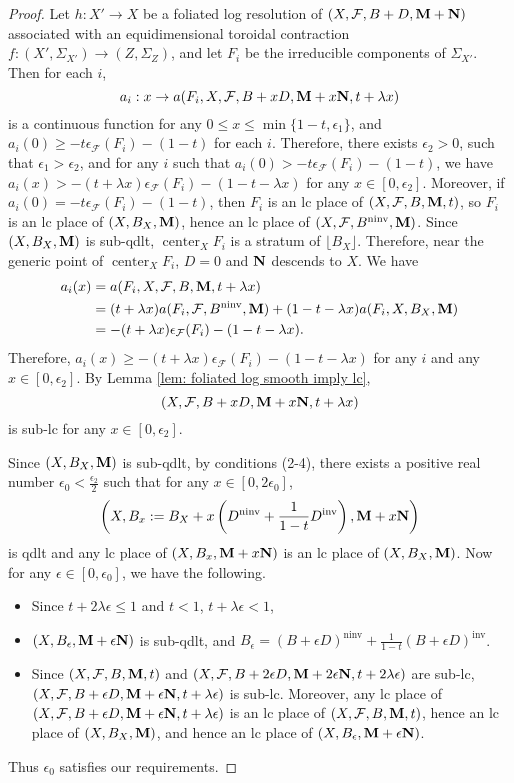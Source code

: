 \documentclass[12pt]{amsart}
\numberwithin{equation}{section}
\newcommand{\Mm}{{\bf{M}}}
\newcommand{\Nn}{{\bf{N}}}
\newcommand{\Center}{\operatorname{center}}
\newcommand{\ninv}{\operatorname{ninv}}
\newcommand{\inv}{\operatorname{inv}}
\newcommand{\Ff}{\mathcal{F}}
\theoremstyle{definition}
\theoremstyle{definition}
\theoremstyle{definition}
\begin{document}
\begin{proof}
Let $h: X'\rightarrow X$ be a foliated log resolution of $(X,\Ff,B+D,\Mm+\Nn)$ associated with an equidimensional toroidal contraction $f: (X',\Sigma_{X'})\rightarrow (Z,\Sigma_{Z})$, and let $F_i$ be the irreducible components of $\Sigma_{X'}$. Then for each $i$, 
$$a_i: x\rightarrow a(F_i,X,\Ff,B+xD,\Mm+x\Nn,t+\lambda x)$$
is a continuous function for any $0\leq x\leq\min\{1-t,\epsilon_1\}$, and $a_i(0)\geq-t\epsilon_{\Ff}(F_i)-(1-t)$ for each $i$. Therefore, there exists $\epsilon_2>0$, such that $\epsilon_1>\epsilon_2$, and for any $i$ such that $a_i(0)>-t\epsilon_{\Ff}(F_i)-(1-t)$, we have $a_i(x)>-(t+\lambda x)\epsilon_{\Ff}(F_i)-(1-t-\lambda x)$ for any $x\in [0,\epsilon_2]$. Moreover, if $a_i(0)=-t\epsilon_{\Ff}(F_i)-(1-t)$, then $F_i$ is an lc place of $(X,\Ff,B,\Mm,t)$, so $F_i$ is an lc place of $(X,B_{X},\Mm)$, hence an lc place of $(X,\Ff,B^{\ninv},\Mm)$.
Since $(X,B_{X},\Mm)$ is sub-qdlt, 
 $\Center_XF_i$ is a stratum of $\lfloor B_X\rfloor$. Therefore, near the generic point of $\Center_{X}F_i$, $D=0$ and $\Nn$ descends to $X$. We have
\begin{align*}
   a_i(x)&=a(F_i,X,\Ff,B,\Mm,t+\lambda x)\\
   &=(t+\lambda x)a(F_i,\Ff,B^{\ninv},\Mm)+(1-t-\lambda x)a(F_i,X,B_{X},\Mm)\\
   &=-(t+\lambda x)\epsilon_{\Ff}(F_i)-(1-t-\lambda x). 
\end{align*}
Therefore, $a_i(x)\geq -(t+\lambda x)\epsilon_{\Ff}(F_i)-(1-t-\lambda x)$ for any $i$ and any $x\in [0,\epsilon_2]$. By Lemma \ref{lem: foliated log smooth imply lc},  $$(X,\Ff,B+xD,\Mm+x\Nn,t+\lambda x)$$
is sub-lc for any $x\in [0,\epsilon_2]$. 

Since $(X,B_X,\Mm)$ is sub-qdlt, by conditions (2-4), there exists a positive real number $\epsilon_0<\frac{\epsilon_2}{2}$ such that for any $x\in [0,2\epsilon_0]$, $$\left(X,B_x:=B_X+x\left(D^{\ninv}+\frac{1}{1-t}D^{\inv}\right),\Mm+x\Nn\right)$$
is qdlt and any lc place of $(X,B_x,\Mm+x\Nn)$ is an lc place of $(X,B_X,\Mm)$. Now for any $\epsilon\in [0,\epsilon_0]$, we have the following.
\begin{itemize}
    \item Since $t+2\lambda\epsilon\leq 1$ and $t<1$, $t+\lambda\epsilon<1$,
    \item $(X,B_\epsilon,\Mm+\epsilon\Nn)$ is sub-qdlt, and $B_{\epsilon}=(B+\epsilon D)^{\ninv}+\frac{1}{1-t}(B+\epsilon D)^{\inv}$.
    \item Since $(X,\Ff,B,\Mm,t)$ and $(X,\Ff,B+2\epsilon D,\Mm+2\epsilon\Nn,t+2\lambda\epsilon)$ are sub-lc, $(X,\Ff,B+\epsilon D,\Mm+\epsilon\Nn,t+\lambda\epsilon)$ is sub-lc. Moreover, any lc place of $(X,\Ff,B+\epsilon D,\Mm+\epsilon\Nn,t+\lambda\epsilon)$ is an lc place of $(X,\Ff,B,\Mm,t)$, hence an lc place of $(X,B_X,\Mm)$, and hence an lc place of $(X,B_{\epsilon},\Mm+\epsilon\Nn)$.
\end{itemize}
Thus $\epsilon_0$ satisfies our requirements.
\end{proof}
\end{document}

